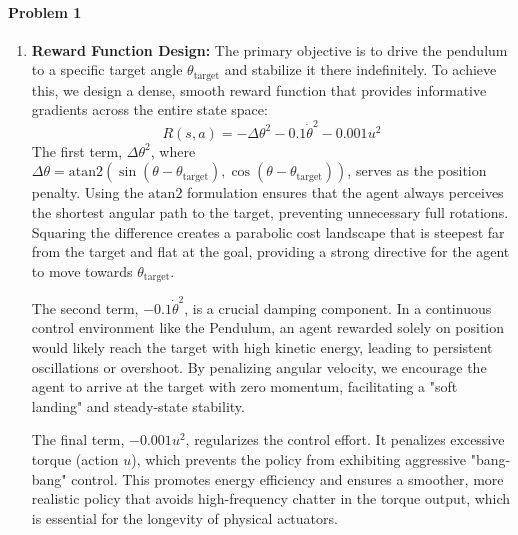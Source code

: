 \documentclass[11pt]{article}
\begin{document}
\paragraph*{Problem 1}
\begin{enumerate}
    \item \textbf{Reward Function Design:} The primary objective is to drive the pendulum to a specific target angle $\theta_{\text{target}}$ and stabilize it there indefinitely. To achieve this, we design a dense, smooth reward function that provides informative gradients across the entire state space:
    \begin{equation}
    R(s, a) = - \Delta\theta^2 - 0.1 \dot{\theta}^2 - 0.001 u^2
    \end{equation}
    The first term, $\Delta\theta^2$, where $\Delta\theta = \text{atan2}(\sin(\theta - \theta_{\text{target}}), \cos(\theta - \theta_{\text{target}}))$, serves as the position penalty. Using the $\text{atan2}$ formulation ensures that the agent always perceives the shortest angular path to the target, preventing unnecessary full rotations. Squaring the difference creates a parabolic cost landscape that is steepest far from the target and flat at the goal, providing a strong directive for the agent to move towards $\theta_{\text{target}}$.
    
    The second term, $- 0.1 \dot{\theta}^2$, is a crucial damping component. In a continuous control environment like the Pendulum, an agent rewarded solely on position would likely reach the target with high kinetic energy, leading to persistent oscillations or overshoot. By penalizing angular velocity, we encourage the agent to arrive at the target with zero momentum, facilitating a "soft landing" and steady-state stability.
    
    The final term, $- 0.001 u^2$, regularizes the control effort. It penalizes excessive torque (action $u$), which prevents the policy from exhibiting aggressive "bang-bang" control. This promotes energy efficiency and ensures a smoother, more realistic policy that avoids high-frequency chatter in the torque output, which is essential for the longevity of physical actuators.


\end{enumerate}
\end{document}
